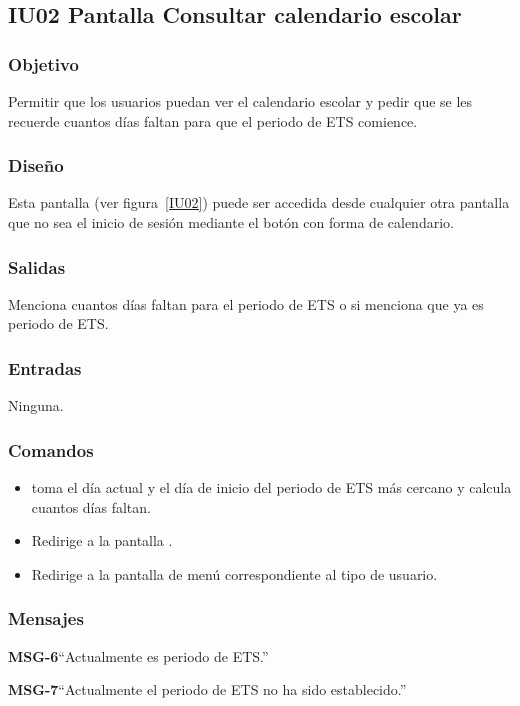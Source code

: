 
\subsection{IU02 Pantalla Consultar calendario escolar}

\subsubsection{Objetivo}
Permitir que los usuarios puedan ver el calendario escolar y pedir que se les recuerde cuantos días faltan para que el periodo de ETS comience.
\subsubsection{Diseño}
    Esta pantalla  (ver figura~\ref{IU02}) puede ser accedida desde cualquier otra pantalla que no sea el inicio de sesión mediante el botón con forma de calendario.


\subsubsection{Salidas}

    Menciona cuantos días faltan para el periodo de ETS o si menciona que ya es periodo de ETS.

\subsubsection{Entradas}
   Ninguna.

\subsubsection{Comandos}
\begin{itemize}
    \item {} toma el día actual y el día de inicio del periodo de ETS más cercano y calcula cuantos días faltan.
    \item {} Redirige a la pantalla .
    \item {} Redirige a la pantalla de menú correspondiente al tipo de usuario.
\end{itemize}

\subsubsection{Mensajes}
     
\begin{Citemize}
    \item {\bf MSG-6}{``Actualmente es periodo de ETS.''}

    \item {\bf MSG-7}{``Actualmente el periodo de ETS no ha sido establecido.''}
\end{Citemize}

